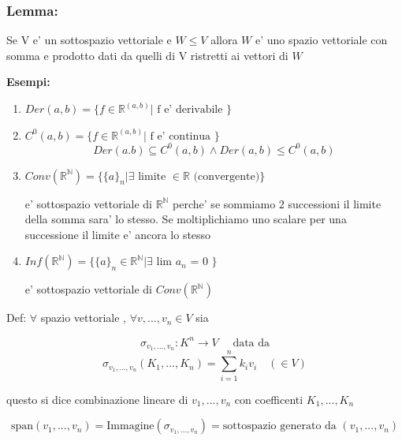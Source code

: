 \documentclass{article}
\begin{document}
\subsubsection*{Lemma:}
\begin{flushleft}
	Se V e' un sottospazio vettoriale e $W \leq V$ allora $W$ e' uno spazio vettoriale con somma e prodotto dati da quelli di V ristretti ai vettori di $W$
\end{flushleft}
\textbf{Esempi:}
\begin{enumerate}
	\item $Der(a,b)=\{ f \in \mathbb{R}^{(a,b)} | \text{ f e' derivabile } \}$
	\item $C^0(a,b)= \{ f \in \mathbb{R}^{(a,b)} | \text{ f e' continua } \}$
	      \begin{equation*}
		      Der(a.b) \subseteq C^0(a,b) \land Der(a,b) \leq C^0(a,b)
	      \end{equation*}
	\item $Conv(\mathbb{R}^{\mathbb{N}}) = \{ \{a\}_n | \exists \text{ limite $\in \mathbb{R}$ (convergente)}\}$
	      \begin{flushleft}
		      e' sottospazio vettoriale di $\mathbb{R}^{\mathbb{N}}$ perche' se sommiamo 2 successioni il limite della somma sara' lo stesso.
		      Se moltiplichiamo uno scalare per una successione il limite e' ancora lo stesso
	      \end{flushleft}
	\item $Inf(\mathbb{R}^{\mathbb{N}}) =\{ \{ a \}_n \in \mathbb{R}^{\mathbb{N}} | \exists \text{ lim $a_n$ = 0 } \}$
	      \begin{flushleft}
		      e' sottospazio vettoriale di $Conv(\mathbb{R}^{\mathbb{N}})$
	      \end{flushleft}
\end{enumerate}
\begin{flushleft}
	Def: $\forall$ spazio vettoriale , $\forall v,...,v_n \in V$ sia
\end{flushleft}
\begin{equation*}
	\sigma_{v_1,...,v_n}: K^n \to V \quad \text{ data da}
\end{equation*}
\begin{equation*}
	\sigma_{v_1,...,v_n} (K_1,...,K_n) = \sum^n_{i=1} k_i v_i \quad (\in V)
\end{equation*}
\begin{flushleft}
	questo si dice combinazione lineare di $v_1,...,v_n$ con coefficenti $K_1,...,K_n$
\end{flushleft}
\begin{equation*}
	\text{span}(v_1,...,v_n)=\text{Immagine}(\sigma_{v_1,...,v_n}) = \text{sottospazio generato da }(v_1,...,v_n)
\end{equation*}
\end{document}

